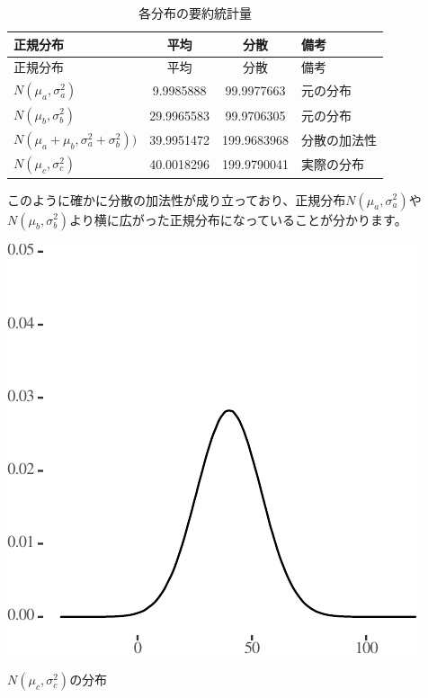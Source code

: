\documentclass[a4paper]{tufte-handout}
\begin{document}
\begin{longtable}[]{@{}lccl@{}}
\caption{各分布の要約統計量}\tabularnewline
\toprule
正規分布 & 平均 & 分散 & 備考 \\
\midrule
\endfirsthead
\toprule
正規分布 & 平均 & 分散 & 備考 \\
\midrule
\endhead
\(N(\mu_a, \sigma^2_a)\) & 9.9985888 & 99.9977663 & 元の分布 \\
\(N(\mu_b, \sigma^2_b)\) & 29.9965583 & 99.9706305 & 元の分布 \\
\(N(\mu_a + \mu_b, \sigma^2_a + \sigma^2_b))\) & 39.9951472 &
199.9683968 & 分散の加法性 \\
\(N(\mu_c, \sigma^2_c)\) & 40.0018296 & 199.9790041 & 実際の分布 \\
\bottomrule
\end{longtable}

このように確かに分散の加法性が成り立っており、正規分布\(N(\mu_a, \sigma^2_a)\)や\(N(\mu_b,\sigma^2_b)\)より横に広がった正規分布になっていることが分かります。

\begin{marginfigure}

{\centering \includegraphics{AdditivityOfVariance_files/figure-latex/unnamed-chunk-5-1} 

}

\caption[$N(\mu_c, \sigma^2_c)$の分布]{$N(\mu_c, \sigma^2_c)$の分布}\label{fig:unnamed-chunk-5}
\end{marginfigure}
\end{document}
